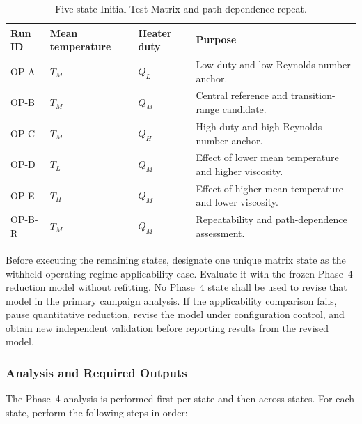 \documentclass[11pt]{article}
\begin{document}
\begin{table}[htbp]
    \centering
    \caption{Five-state Initial Test Matrix and path-dependence repeat.}
    \label{tab:matrix5}
    \begin{tabularx}{\textwidth}{
        @{}
        >{\raggedright\arraybackslash}p{0.90in}
        >{\raggedright\arraybackslash}p{1.35in}
        >{\raggedright\arraybackslash}p{1.25in}
        >{\raggedright\arraybackslash}X
        @{}
    }
        \toprule
        \textbf{Run ID} &
        \textbf{Mean temperature} &
        \textbf{Heater duty} &
        \textbf{Purpose} \\
        \midrule

        OP-A & $T_M$ & $Q_L$ & Low-duty and low-Reynolds-number anchor. \\
        OP-B & $T_M$ & $Q_M$ & Central reference and transition-range candidate. \\
        OP-C & $T_M$ & $Q_H$ & High-duty and high-Reynolds-number anchor. \\
        OP-D & $T_L$ & $Q_M$ & Effect of lower mean temperature and higher viscosity. \\
        OP-E & $T_H$ & $Q_M$ & Effect of higher mean temperature and lower viscosity. \\
        OP-B-R & $T_M$ & $Q_M$ & Repeatability and path-dependence assessment. \\

        \bottomrule
    \end{tabularx}
\end{table}

Before executing the remaining states, designate one unique matrix state as the withheld operating-regime applicability case. Evaluate it with the frozen Phase~4 reduction model without refitting. No Phase~4 state shall be used to revise that model in the primary campaign analysis. If the applicability comparison fails, pause quantitative reduction, revise the model under configuration control, and obtain new independent validation before reporting results from the revised model.

\subsubsection{Analysis and Required Outputs}

The Phase~4 analysis is performed first per state and then across states. For each state, perform the following steps in order:
\end{document}

